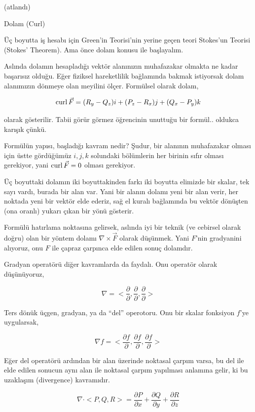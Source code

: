 \documentclass[12pt,fleqn]{article}\usepackage{../../common}
\begin{document}
(atlandı)

Dolam (Curl)

Üç boyutta iş hesabı için Green'in Teorisi'nin yerine geçen teori Stokes'un
Teorisi (Stokes' Theorem). Ama önce dolam konusu ile başlayalım.

Aslında dolamın hesapladığı vektör alanınızın muhafazakar olmakta ne kadar
başarısız olduğu. Eğer fiziksel hareketlilik bağlamında bakmak istiyorsak
dolam alanımızın dönmeye olan meyilini ölçer. Formülsel olarak dolam,

$$
\operatorname{curl} \vec{F} = (R_y - Q_z) i + (P_z - R_x) j + (Q_x - P_y) k
$$

olarak gösterilir. Tabii görür görmez öğrencinin unuttuğu bir formül..
oldukca karışık çünkü.

Formülün yapısı, başladığı kavram nedir? Şudur, bir alanının muhafazakar olması
için üstte gördüğümüz $i,j,k$ solundaki bölümlerin her birinin sıfır olması
gerekiyor, yani $\operatorname{curl} \vec{F} = 0$ olması gerekiyor.

Üç boyuttaki dolamın iki boyuttakinden farkı iki boyutta elimizde bir skalar,
tek sayı vardı, burada bir alan var. Yani bir alanın dolamı yeni bir alan verir,
her noktada yeni bir vektör elde ederiz, sağ el kuralı bağlamında bu vektör
dönüşten (ona oranlı) yukarı çıkan bir yönü gösterir. 

Formülü hatırlama noktasına gelirsek, aslında iyi bir teknik (ve cebirsel olarak
doğru) olan bir yöntem dolamı $\nabla \times \vec{F}$ olarak düşünmek. Yani
$F$'nin gradyanini alıyoruz, onu $F$ ile çapraz çarpınca elde edilen sonuç
dolamdır. 

Gradyan operatörü diğer kavramlarda da faydalı. Onu operatör olarak düşünüyoruz,

$$
\nabla = < \frac{\partial }{\partial },
           \frac{\partial }{\partial },
           \frac{\partial }{\partial } >
$$

Ters dönük üçgen, gradyan, ya da ``del'' operotoru. Onu bir skalar fonksiyon
$f$'ye uygularsak,

$$
\nabla f = < \frac{\partial f}{\partial },
             \frac{\partial f}{\partial },
             \frac{\partial f}{\partial } >
$$

Eğer del operatörü ardından bir alan üzerinde noktasal çarpım varsa, bu del
ile elde edilen sonucun aynı alan ile noktasal çarpım yapılması anlamına
gelir, ki bu uzaklaşım (divergence) kavramıdır.

$$
\nabla \cdot < P,Q,R > =
\frac{\partial P}{\partial x} +
\frac{\partial Q}{\partial y} +
\frac{\partial R}{\partial z}
$$
\end{document}
